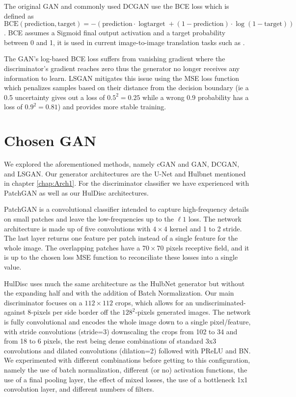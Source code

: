 The original \ac{GAN} and commonly used \ac{DCGAN} use the \ac{BCE} loss which is defined as $\text{BCE}(\text{prediction}, \text{target})=-(\text{prediction}\cdot{\log{\text{target}}}+(1-\text{prediction})\cdot \log{(1-\text{target})})$. \ac{BCE} assumes a Sigmoid final output activation and a target probability between 0 and 1, it is used in current image-to-image translation tasks such as \cite{pix2pix}\cite{cyclegan}.

The \ac{GAN}'s log-based \ac{BCE} loss suffers from vanishing gradient where the discriminator's gradient reaches zero thus the generator no longer receives any information to learn. \ac{LSGAN} mitigates this issue using the \acl{MSE} loss function which penalizes samples based on their distance from the decision boundary (ie a 0.5 uncertainty gives out a loss of $0.5^2=0.25$ while a wrong 0.9 probability has a loss of $0.9^2=0.81$) and provides more stable training. \cite{lsgan}

\section{Chosen GAN}

We explored the aforementioned methods, namely \ac{cGAN} and \ac{GAN}, \ac{DCGAN}, and \ac{LSGAN}. Our generator architectures are the U-Net \cite{unet} and Hulbnet mentioned in chapter \ref{chap:Arch1}. For the discriminator classifier we have experienced with PatchGAN \cite{pix2pix} as well as our HulDisc architectures.


PatchGAN is a convolutional classifier intended to capture high-frequency details on small patches and leave the low-frequencies up to the $\ell 1$ loss. The network architecture is made up of five convolutions with $4 \times 4$ kernel and 1 to 2 stride. The last layer returns one feature per patch instead of a single feature for the whole image. The overlapping patches have a $70 \times 70$ pixels receptive field, and it is up to the chosen loss \ac{MSE} function to reconciliate these losses into a single value.

HulDisc uses much the same architecture as the HulbNet generator but without the expanding half and with the addition of Batch Normalization. Our main discriminator focuses on a $112\times 112$ crops, which allows for an undiscriminated-against 8-pixels per side border off the $128^2$-pixels generated images. The network is fully convolutional and encodes the whole image down to a single pixel/feature, with stride convolutions (stride=3) downscaling the crops from 102 to 34 and from 18 to 6 pixels, the rest being dense combinations of standard 3x3 convolutions and dilated convolutions (dilation=2) followed with \ac{PReLU} and \acl{BN}. We experimented with different combinations before getting to this configuration, namely the use of batch normalization, different (or no) activation functions, the use of a final pooling layer, the effect of mixed losses, the use of a bottleneck 1x1 convolution layer, and different numbers of filters.

